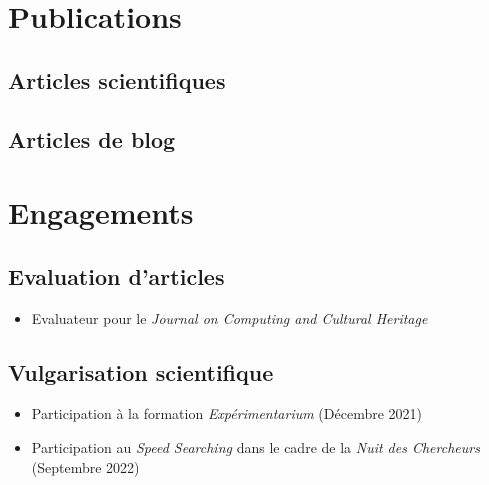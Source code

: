 \documentclass[11pt,a4paper,sans]{moderncv} %
\begin{document}

\section{Publications}
\subsection{Articles scientifiques}
\begin{refsection}
    \nocite{*}
    \printbibliography[heading=none]
\end{refsection}

\subsection{Articles de blog}
\begin{refsection}
    \nocite{*}
    \printbibliography[heading=none]
\end{refsection}


\section{Engagements}
\subsection{Evaluation d'articles}
\begin{itemize}
    \item Evaluateur pour le \textit{Journal on Computing and Cultural Heritage}
\end{itemize}

\subsection{Vulgarisation scientifique}
\begin{itemize}
    \item Participation à la formation \textit{Expérimentarium} (Décembre 2021)
    \item Participation au \textit{Speed Searching} dans le cadre de la \textit{Nuit des Chercheurs} (Septembre 2022)
\end{itemize}
\end{document}
